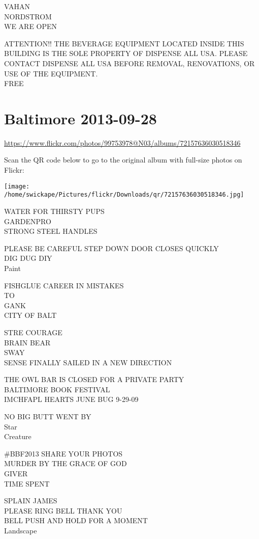 \documentclass[10pt,letterpaper]{article}
\begin{document}
VAHAN\\
NORDSTROM\\
WE ARE OPEN

ATTENTION!! THE BEVERAGE EQUIPMENT LOCATED INSIDE THIS BUILDING IS THE SOLE PROPERTY OF DISPENSE ALL USA.  PLEASE CONTACT DISPENSE ALL USA BEFORE REMOVAL, RENOVATIONS, OR USE OF THE EQUIPMENT.\\
FREE


\section*{Baltimore 2013-09-28}

\url{https://www.flickr.com/photos/99753978@N03/albums/72157636030518346}

Scan the QR code below to go to the original album with full-size photos on Flickr:

\texttt{[image: /home/swickape/Pictures/flickr/Downloads/qr/72157636030518346.jpg]}


WATER FOR THIRSTY PUPS\\
GARDENPRO\\
STRONG STEEL HANDLES

PLEASE BE CAREFUL STEP DOWN DOOR CLOSES QUICKLY\\
DIG DUG DIY\\
Paint

FISHGLUE CAREER IN MISTAKES\\
TO\\
GANK\\
CITY OF BALT

STRE COURAGE\\
BRAIN BEAR\\
SWAY\\
SENSE FINALLY SAILED IN A NEW DIRECTION

THE OWL BAR IS CLOSED FOR A PRIVATE PARTY\\
BALTIMORE BOOK FESTIVAL\\
IMCHFAPL HEARTS JUNE BUG 9{-}29{-}09

NO BIG BUTT WENT BY\\
Star\\
Creature

\#BBF2013 SHARE YOUR PHOTOS\\
MURDER BY THE GRACE OF GOD\\
GIVER\\
TIME SPENT

SPLAIN JAMES\\
PLEASE RING BELL THANK YOU\\
BELL PUSH AND HOLD FOR A MOMENT\\
Landscape
\end{document}
